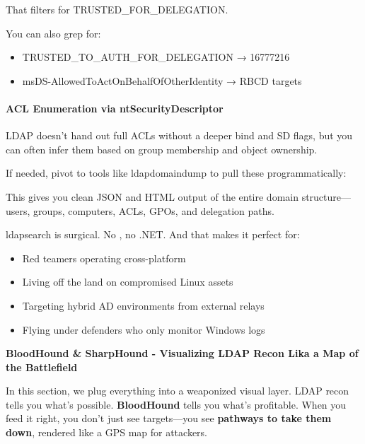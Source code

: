 That filters for TRUSTED\_FOR\_DELEGATION.

You can also grep for:

\begin{itemize}
    \item TRUSTED\_TO\_AUTH\_FOR\_DELEGATION → 16777216

    \item msDS-AllowedToActOnBehalfOfOtherIdentity → RBCD targets

\end{itemize}

\paragraph{\textbf{ACL Enumeration via }\textbf{ntSecurityDescriptor}}

LDAP doesn’t hand out full ACLs without a deeper bind and SD flags, but you can often infer them based on group membership and object ownership.

If needed, pivot to tools like ldapdomaindump to pull these programmatically:


This gives you clean JSON and HTML output of the entire domain structure—users, groups, computers, ACLs, GPOs, and delegation paths.

ldapsearch is surgical. No  , no .NET. And that makes it perfect for:

\begin{itemize}
    \item Red teamers operating cross-platform
    \item Living off the land on compromised Linux assets
    \item Targeting hybrid AD environments from external relays
    \item Flying under defenders who only monitor Windows logs

\end{itemize}

\textbf{BloodHound \& SharpHound - Visualizing LDAP Recon Lika a Map of the Battlefield}

In this section, we plug everything into a weaponized visual layer. LDAP recon tells you what’s possible. \textbf{BloodHound} tells you what’s profitable. When you feed it right, you don’t just see targets—you see \textbf{pathways to take them down}, rendered like a GPS map for attackers.

